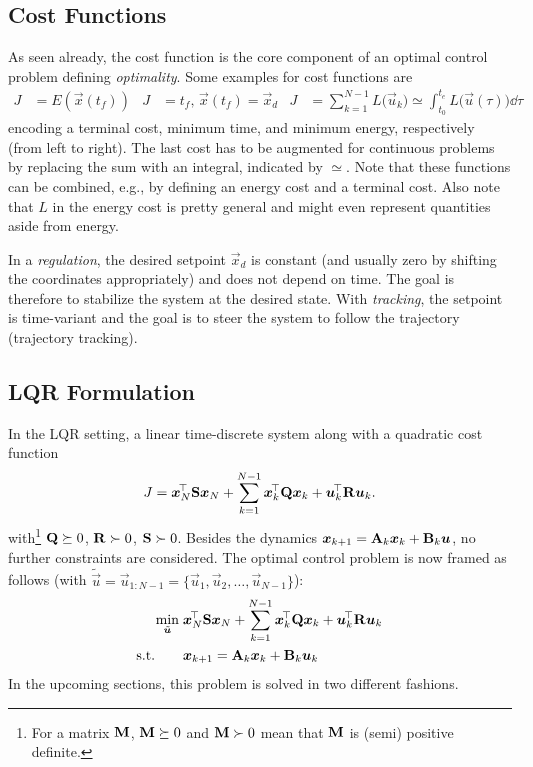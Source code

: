 		\subsection{Cost Functions}
			As seen already, the cost function is the core component of an optimal control problem defining \emph{optimality}. Some examples for cost functions are
			\begin{align}
				J &= E(\vec{x}(t_f)) &
				J &= t_f,\, \vec{x}(t_f) = \vec{x}_d &
				J &= \sum_{k = 1}^{N - 1} L\bigl( \vec{u}_k \bigr) \simeq \int_{t_0}^{t_e}\! L\bigl( \vec{u}(\tau) \bigr) \dd{\tau}
			\end{align}
			encoding a terminal cost, minimum time, and minimum energy, respectively (from left to right). The last cost has to be augmented for continuous problems by replacing the sum with an integral, indicated by \( \simeq \). Note that these functions can be combined, e.g., by defining an energy cost and a terminal cost. Also note that \(L\) in the energy cost is pretty general and might even represent quantities aside from energy.

			In a \emph{regulation}, the desired setpoint \(\vec{x}_d\) is constant (and usually zero by shifting the coordinates appropriately) and does not depend on time. The goal is therefore to stabilize the system at the desired state. With \emph{tracking}, the setpoint is time-variant and the goal is to steer the system to follow the trajectory (trajectory tracking).

		\subsection{LQR Formulation}
			In the LQR setting, a linear time-discrete system along with a quadratic cost function
			\begin{equation}
				J = \bm{x}_N^{\!\top} \bm{\mathrm{S}} \bm{x}_N + \sum_{k = 1}^{N - 1} \bm{x}_k^{\!\top} \bm{\mathrm{Q}} \bm{x}_k + \bm{u}_k^{\!\top} \bm{\mathrm{R}} \bm{u}_k.  \label{eqn:lqrCost}
			\end{equation}
			with\footnote{For a matrix \(\bm{\mathrm{M}}\), \( \bm{\mathrm{M}} \succeq 0\) and \( \bm{\mathrm{M}} \succ 0 \) mean that \(\bm{\mathrm{M}}\) is (semi) positive definite.} \( \bm{\mathrm{Q}} \succeq 0 \), \( \bm{\mathrm{R}} \succ 0 \), \( \bm{\mathrm{S}} \succ 0 \). Besides the dynamics \( \bm{x}_{k + 1} = \bm{\mathrm{A}}_k \bm{x}_k + \bm{\mathrm{B}}_k \bm{u} \), no further constraints are considered. The optimal control problem is now framed as follows (with \( \tilde{\vec{u}} = \vec{u}_{1:N - 1} = \{ \vec{u}_1, \vec{u}_2, \dots, \vec{u}_{N - 1} \} \)):
			\begin{align}
				\min_{\tilde{\bm{u}}}\; & \bm{x}_N^{\!\top} \bm{\mathrm{S}} \bm{x}_N + \sum_{k = 1}^{N - 1} \bm{x}_k^{\!\top} \bm{\mathrm{Q}} \bm{x}_k + \bm{u}_k^{\!\top} \bm{\mathrm{R}} \bm{u}_k \\
				\text{s.t.}\qquad&
					\begin{aligned}
						\bm{x}_{k + 1} &= \bm{\mathrm{A}}_k \bm{x}_k + \bm{\mathrm{B}}_k \bm{u}_k
					\end{aligned}
				\label{eqn:lqr}
			\end{align}
			In the upcoming sections, this problem is solved in two different fashions.

